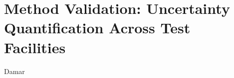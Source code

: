 \chapter[Method Validation]{Method Validation: Uncertainty Quantification Across Test Facilities}\label{ch:method_validation}

Damar






